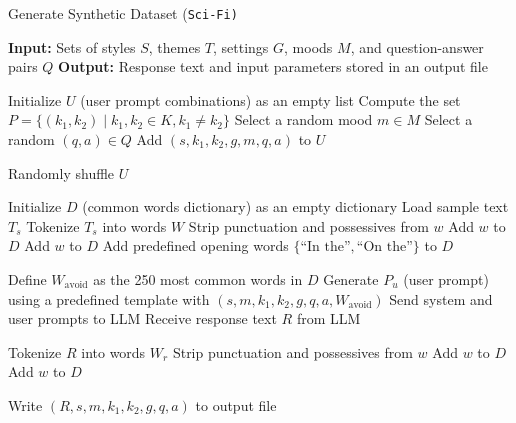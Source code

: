 \begin{algorithm}
\label{app:scifi_alg}
\caption{Generate Synthetic Dataset (\texttt{Sci-Fi)}}
\begin{algorithmic}[1]

\State \textbf{Input:} Sets of styles $S$, themes $T$, settings $G$, moods $M$, and question-answer pairs $Q$
\State \textbf{Output:} Response text and input parameters stored in an output file

\State Initialize $U$ (user prompt combinations) as an empty list
\State Compute the set $P = \{ (k_1, k_2) \mid k_1, k_2 \in K, k_1 \neq k_2 \}$
    \State Select a random mood $m \in M$
    \State Select a random $(q, a) \in Q$
    \State Add $(s, k_1, k_2, g, m, q, a)$ to $U$
\EndFor

\State Randomly shuffle $U$

\State Initialize $D$ (common words dictionary) as an empty dictionary
\State Load sample text $T_s$
\State Tokenize $T_s$ into words $W$
    \State Strip punctuation and possessives from $w$
        \State Add $w$ to $D$
    \EndIf
        \State Add $w$ to $D$
    \EndIf
\EndFor
\State Add predefined opening words $\{\text{``In the''}, \text{``On the''}\}$ to $D$

    \State Define $W_{\text{avoid}}$ as the 250 most common words in $D$
    \State Generate $P_u$ (user prompt) using a predefined template with $(s, m, k_1, k_2, g, q, a, W_{\text{avoid}})$
    \State Send system and user prompts to LLM
    \State Receive response text $R$ from LLM

    \State Tokenize $R$ into words $W_r$
        \State Strip punctuation and possessives from $w$
            \State Add $w$ to $D$
        \EndIf
            \State Add $w$ to $D$
        \EndIf
    \EndFor
    
    \State Write $(R, s, m, k_1, k_2, g, q, a)$ to output file
\EndFor

\end{algorithmic}
\end{algorithm}


